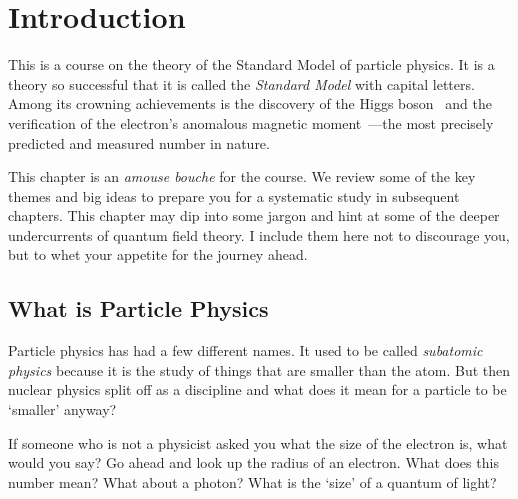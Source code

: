 \documentclass[12pt, oneside]{report}    %
\let\oldsection\section
\def\section{%
  \setcounter{sidenote}{1}%
  \oldsection
}
\begin{document}
\chapter{Introduction}

This is a course on the theory of the Standard Model of particle physics. It is a theory so successful that it is called the \emph{Standard Model} with capital letters. Among its crowning achievements is the discovery of the Higgs boson~\autocite{CMS:2012zhx, ATLAS:2012ae} and the verification of the electron's anomalous magnetic moment~\autocite{Fan:2022eto}---the most precisely predicted and measured number in nature.

This chapter is an \emph{amouse bouche} for the course. We review some of the key themes and big ideas to prepare you for a systematic study in subsequent chapters. This chapter may dip into some jargon and hint at some of the deeper undercurrents of quantum field theory. I include them here not to discourage you, but to whet your appetite for the journey ahead.

\section{What is Particle Physics}

Particle physics has had a few different names. It used to be called \emph{subatomic physics} because it is the study of things that are smaller than the atom. But then nuclear physics split off as a discipline and what does it mean for a particle to be `smaller' anyway?

\begin{exercise}
If someone who is not a physicist asked you what the size of the electron is, what would you say? Go ahead and look up the radius of an electron. What does this number mean? What about a photon? What is the `size' of a quantum of light?\sidenotemark
\end{exercise}
\end{document}
